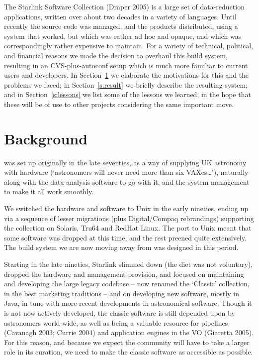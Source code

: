 \documentclass[11pt,twoside]{article}
\begin{document}
The Starlink Software Collection (Draper 2005) is a large set of
data-reduction 
applications, written over about two decades in a variety of
languages.  Until recently the source code was managed, and the
products distributed, using a system that worked, but which was
rather ad hoc and opaque, and which was correspondingly rather
expensive to maintain.  For a variety of technical, political, and financial
reasons we made the decision to overhaul this build system, resulting
in an CVS-plus-autoconf setup which is much more familiar to current users and
developers.   In Section~\ref{s:background} we elaborate the
motivations for this and the problems we faced; in
Section~\ref{s:result} we briefly describe the resulting system; and
in Section~\ref{s:lessons} we list some of the lessons we learned, in
the hope that these will be of use to other projects considering the
same important move.


\section{Background}
\label{s:background}


 was set up
originally in the late seventies, as a way of supplying UK astronomy
with hardware (`astronomers will never need more than six
VAXes\dots'), naturally along with the data-analysis software to go
with it, and the system management to make it all work smoothly.

We switched the hardware and software to Unix in the early nineties,
ending up via a sequence of lesser migrations (plus Digital/Compaq
rebrandings) supporting the collection on Solaris, Tru64 and RedHat
Linux.  The port to Unix meant that some software was dropped at this
time, and the rest preened quite extensively.  The build system we are
now moving away from was designed in this period.

Starting in the late nineties, Starlink slimmed down (the diet was not
voluntary), dropped the hardware and management provision, and focused
on maintaining and developing the large legacy codebase -- now renamed
the `Classic' collection, in the best marketing traditions -- and on
developing new software, mostly in Java, in tune with more recent
developments in astronomical software.  Though it is not now actively
developed, the classic software is still depended upon by astronomers
world-wide, as well as being a valuable resource for pipelines
(Cavanagh 2003; Currie 2004) and application engines in the VO (Giaretta 2005).
For this reason, and because we expect the community will have to take
a larger role in its curation, we need to make the classic software as
accessible as possible.
\end{document}
